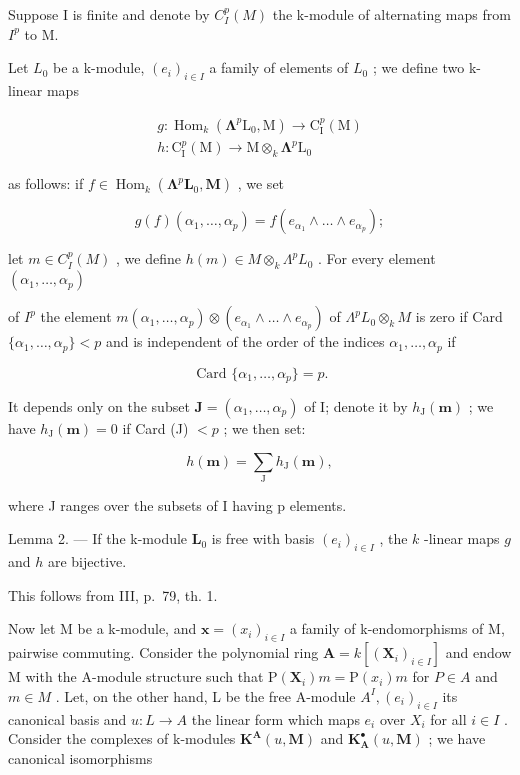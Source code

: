 Suppose I is finite and denote by \(C_{I}^{p}(M)\) the k-module of alternating maps from \(I^{p}\) to M.

Let \(L_{0}\) be a k-module, \((e_{i})_{i\in I}\) a family of elements of \(L_{0}\) ; we define two k-linear maps

\[
\begin{array}{l} g: \operatorname{Hom} _ {k} (\symbf {\Lambda} ^ {p} \mathrm{L} _ {0}, \mathrm{M}) \to \mathrm{C} _ {\mathrm{I}} ^ {p} (\mathrm{M}) \\ h: \mathrm{C} _ {\mathrm{I}} ^ {p} (\mathrm{M}) \to \mathrm{M} \otimes_ {k} \symbf {\Lambda} ^ {p} \mathrm{L} _ {0} \end{array}
\]

as follows: if \(f \in \operatorname{Hom}_k(\symbf{\Lambda}^p \mathbf{L}_0, \mathbf{M})\) , we set

\[
g (f) (\alpha_ {1}, \dots , \alpha_ {p}) = f (e _ {\alpha_ {1}} \wedge \dots \wedge e _ {\alpha_ {p}});
\]

let \(m \in C_{I}^{p}(M)\) , we define \(h(m) \in M \otimes_{k} \Lambda^{p} L_{0}\) . For every element \((\alpha_{1}, \ldots, \alpha_{p})\)

of \(I^{p}\) the element \(m(\alpha_{1},\ldots,\alpha_{p})\otimes(e_{\alpha_{1}}\wedge\ldots\wedge e_{\alpha_{p}})\) of \(\Lambda^{p}L_{0}\otimes_{k}M\) is zero if Card \(\{\alpha_{1},\ldots,\alpha_{p}\}<p\) and is independent of the order of the indices \(\alpha_{1},\ldots,\alpha_{p}\) if

\[
\text { Card } \{\alpha_ {1}, \dots , \alpha_ {p} \} = p.
\]

It depends only on the subset \(\mathbf{J} = (\alpha_{1},\ldots ,\alpha_{p})\) of I; denote it by \(h_\mathrm{J}(\pmb {m})\) ; we have \(h_\mathrm{J}(\pmb {m}) = 0\) if Card (J) \(< p\) ; we then set:

\[
h (\boldsymbol {m}) = \sum_ {\mathrm{J}} h _ {\mathrm{J}} (\boldsymbol {m}),
\]

where J ranges over the subsets of I having p elements.

Lemma 2. --- If the k-module \(\mathbf{L}_{0}\) is free with basis \((e_{i})_{i\in I}\) , the \(k\) -linear maps \(g\) and \(h\) are bijective.

This follows from III, p.~79, th. 1.

Now let M be a k-module, and \(\boldsymbol{x} = (x_{i})_{i \in I}\) a family of k-endomorphisms of M, pairwise commuting. Consider the polynomial ring \(\mathbf{A} = k[(\mathbf{X}_{i})_{i \in I}]\) and endow M with the A-module structure such that \(\mathrm{P}(\mathbf{X}_{i}) m = \mathrm{P}(x_{i}) m\) for \(P \in A\) and \(m \in M\) . Let, on the other hand, L be the free A-module \(A^{I}, (e_{i})_{i \in I}\) its canonical basis and \(u : L \to A\) the linear form which maps \(e_{i}\) over \(X_{i}\) for all \(i \in I\) . Consider the complexes of k-modules \(\mathbf{K}^{\mathbf{A}}(u, \mathbf{M})\) and \(\mathbf{K}_{\mathbf{A}}^{\bullet}(u, \mathbf{M})\) ; we have canonical isomorphisms

